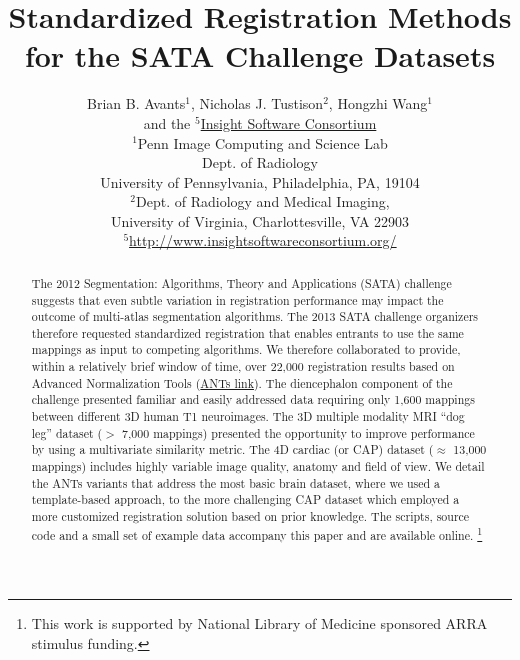 \documentclass{llncs}
\begin{document}
\vspace{-0.1in}
\title{Standardized Registration Methods for the SATA Challenge Datasets}
\author{Brian B. Avants$^1$, Nicholas J. Tustison$^2$, Hongzhi
  Wang$^1$ \\and the
  $^5$\href{http://www.insightsoftwareconsortium.org/}{Insight Software Consortium}\\
$^1$Penn Image Computing and Science Lab \\ Dept. of Radiology \\University of
  Pennsylvania, Philadelphia, PA, 19104\\ 
  $^2$Dept. of Radiology and Medical Imaging, \\ University of Virginia,
  Charlottesville, VA 22903\\
 $^5$\href{http://www.insightsoftwareconsortium.org/}{http://www.insightsoftwareconsortium.org/}}
\maketitle              
\begin{abstract}
The 2012 Segmentation: Algorithms, Theory and Applications (SATA)
challenge suggests that even subtle variation in registration
performance may impact the outcome of multi-atlas segmentation
algorithms. The 2013 SATA challenge organizers therefore requested
standardized registration that enables entrants to use the same
mappings as input to competing algorithms.  We therefore collaborated
to provide, within a relatively brief window of time, over 22,000
registration results based on Advanced Normalization Tools
(\href{http://stnava.github.io/ANTs/}{ANTs link}).
The diencephalon component of the challenge presented familiar and
easily addressed data requiring only 1,600 mappings between different
3D human T1 neuroimages.  The 3D multiple modality MRI ``dog leg'' dataset ($>$ 7,000
mappings) presented the opportunity to improve performance by using
a multivariate similarity metric.  The 4D cardiac (or CAP) dataset
($\approx$ 13,000 mappings) includes highly variable image quality, anatomy
and field of view.  We detail the ANTs variants that address the most basic brain dataset, where we used
a template-based approach, to the more challenging CAP dataset which
employed a more customized registration solution based on prior
knowledge.  The scripts, source code and a small set of example data
accompany this paper and are available online.  
\footnote{This work is supported by National Library of Medicine sponsored ARRA stimulus
funding.}
\end{abstract}
\end{document}
